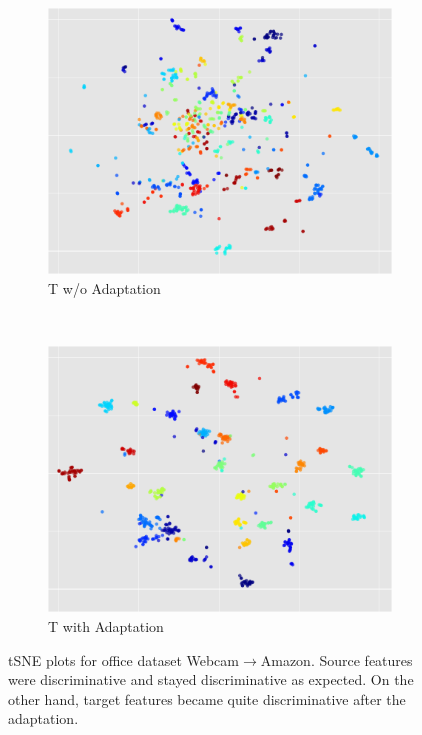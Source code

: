 \begin{figure}[ht]
\begin{subfigure}[b]{0.25\textwidth}
        \includegraphics[width=\textwidth]{before_c_t_c}
        \caption{T w/o Adaptation}
        \label{fig:gull}
    \end{subfigure}~\begin{subfigure}[b]{0.25\textwidth}
        \includegraphics[width=\textwidth]{after_c_t_c}
        \caption{T with Adaptation}
    \end{subfigure}
    \vspace{-5mm}
    \caption{tSNE plots for office dataset Webcam$\rightarrow$Amazon. Source features were discriminative and stayed discriminative as expected. On the other hand, target features became quite discriminative after the adaptation.}

\end{figure}
